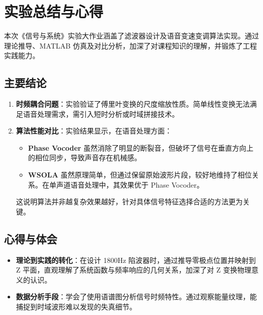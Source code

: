 \documentclass[12pt]{ctexart}
\begin{document}
\newpage


\section{实验总结与心得}

本次《信号与系统》实验大作业涵盖了滤波器设计及语音变速变调算法实现。通过理论推导、MATLAB 仿真及对比分析，加深了对课程知识的理解，并锻炼了工程实践能力。

\subsection{主要结论}
\begin{enumerate}
    \item \textbf{时频耦合问题}：实验验证了傅里叶变换的尺度缩放性质。简单线性变换无法满足语音处理需求，需引入短时分析或时域拼接技术。
    \item \textbf{算法性能对比}：实验结果显示，在语音处理方面：
    \begin{itemize}
        \item \textbf{Phase Vocoder} 虽然消除了明显的断裂音，但破坏了信号在垂直方向上的相位同步，导致声音存在机械感。
        \item \textbf{WSOLA} 虽然原理简单，但通过保留原始波形片段，较好地维持了相位关系。在单声道语音处理中，其效果优于 Phase Vocoder。
    \end{itemize}
    这说明算法并非越复杂效果越好，针对具体信号特征选择合适的方法更为关键。
\end{enumerate}

\subsection{心得与体会}
\begin{itemize}
    \item \textbf{理论到实践的转化}：在设计 1800Hz 陷波器时，通过推导零极点位置并映射到 Z 平面，直观理解了系统函数与频率响应的几何关系，加深了对 Z 变换物理意义的认识。
    \item \textbf{数据分析手段}：学会了使用语谱图分析信号时频特性。通过观察能量纹理，能捕捉到时域波形难以发现的失真细节。
\end{itemize}
\end{document}
